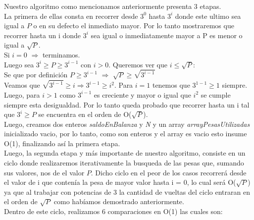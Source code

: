 
Nuestro algoritmo como mencionamos anteriormente presenta 3 etapas.\\
La primera de ellas consta en recorrer desde $3^0$ hasta $3^i$ donde este ultimo sea igual a $P$ o en su defecto el inmediato mayor. Por lo tanto mostraremos que recorrer hasta un i donde $3^i$ sea igual o inmediatamente mayor a P es menor o igual a $\sqrt{P}$.\\


Si $i = 0$ $\Rightarrow$ terminamos.\\
Luego sea $3^i \geq P \geq 3^{i-1}$ con $i > 0$. Queremos ver que $i \leq \sqrt{P}$:\\
Se que por definici\'on $P \geq 3^{i-1}$ $\Rightarrow$ $\sqrt{P} \geq \sqrt{3^{i-1}}$\\
Veamos que $\sqrt{3^{i-1}} \geq i \Rightarrow 3^{i-1} \geq {i^2}$. Para $i = 1$ tenemos que $3^{1-1} \geq 1$ siempre. Luego, para $i > 1$ como ${3^{i-1}}$ es creciente y mayor o igual que $i^2$ se cumple siempre esta desigualdad. Por lo tanto queda probado que recorrer hasta un i tal que $3^i \geq P$ se encuentra en el orden de  O($\sqrt{P}$).\\


 Luego, creamos dos enteros \textit{saldoEnBalanza} y \textit{N} y un array \textit{arrayPesasUtilizadas} inicializado vacio, por lo tanto, como son enteros y el array es vacio esto insume O(1), finalizando as\'i la primera etapa.\\
Luego, la segunda etapa y m\'as importante de nuestro algoritmo, consiste en un ciclo donde realizaremos iterativamente la busqueda de las pesas que, sumando sus valores, nos de el valor $P$. Dicho ciclo en el peor de los casos recorrer\'a desde el valor de i que conten\'ia la pesa de mayor valor hasta i = 0, lo cual ser\'a O($\sqrt{P}$) ya que al trabajar con potencias de 3 la cantidad de vueltas del ciclo entraran en el orden de $\sqrt{P}$ como hab\'iamos demostrado anteriormente.\\ 

Dentro de este ciclo, realizamos 6 comparaciones en O(1) las cuales son:

